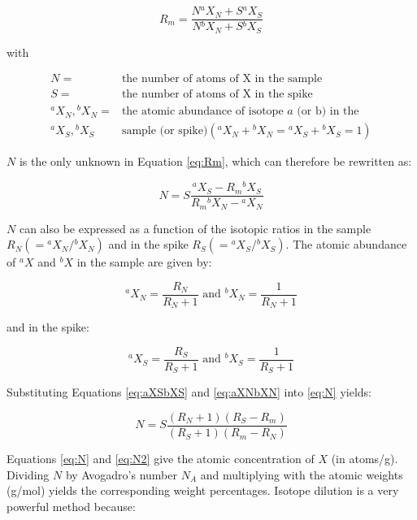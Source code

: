 \documentclass{book}
\begin{document}
\begin{equation}
R_m = \frac{N {}^aX_N + S {}^aX_S}{N {}^bX_N + S {}^bX_S}
\label{eq:Rm}
\end{equation}

with

\begin{equation*}
\begin{array}{rl}
N = & \mbox{the number of atoms of X in the sample}\\
S = & \mbox{the number of atoms of X in the spike}\\
^aX_N, {}^bX_N = & \mbox{the atomic abundance of isotope~} a \mbox{~(or b) in the~}\\
{}^aX_S, {}^bX_S ~~~ & \mbox{sample (or spike)} (^aX_N + {}^bX_N = {}^aX_S + {}^bX_S = 1)
\end{array}
\end{equation*}

$N$ is the only unknown in Equation \ref{eq:Rm}, which can therefore be
rewritten as:

\begin{equation}
N = S \frac{^aX_S - R_m {}^bX_S}{R_m {}^bX_N - {}^aX_N}
\label{eq:N}
\end{equation}

$N$ can also be expressed as a function of the isotopic ratios in the
sample $R_N (={}^aX_N/{}^bX_N)$ and in the spike $R_S
(={}^aX_S/{}^bX_S)$. The atomic abundance of $^aX$ and $^bX$ in the
sample are given by:

\begin{equation}
^aX_N = \frac{R_N}{R_N + 1} \mbox{~and~} {}^bX_N = \frac{1}{R_N + 1}
\label{eq:aXNbXN}
\end{equation}

and in the spike:

\begin{equation}
^aX_S = \frac{R_S}{R_S + 1} \mbox{~and~} {}^bX_S = \frac{1}{R_S + 1}
\label{eq:aXSbXS}
\end{equation}

Substituting Equations \ref{eq:aXSbXS} and \ref{eq:aXNbXN} into
\ref{eq:N} yields:

\begin{equation}
N = S \frac{(R_N+1)(R_S-R_m)}{(R_S+1)(R_m-R_N)}
\label{eq:N2}
\end{equation}

Equations \ref{eq:N} and \ref{eq:N2} give the atomic concentration of
$X$ (in atoms/g).  Dividing $N$ by Avogadro's number $N_A$ and
multiplying with the atomic weights (g/mol) yields the corresponding
weight percentages. Isotope dilution is a very powerful method
because:
\end{document}
